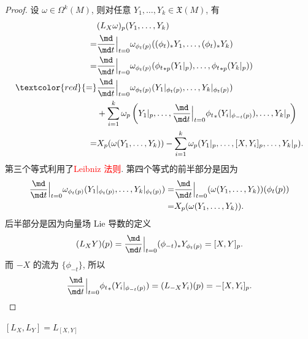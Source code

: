     \begin{proof}
        设 $\omega\in\Omega^k(M)$, 则对任意 $Y_1,\dots,Y_k\in\mathfrak{X}(M)$, 有
        \begin{align*}
            &(L_X\omega)_p(Y_1,\dots,Y_k) \\
            =& \frac{\md}{\md t}\Big|_{t=0}\omega_{\phi_t(p)}((\phi_t)_*Y_1,\dots,(\phi_t)_*Y_k) \\
            =& \frac{\md}{\md t}\Big|_{t=0}\omega_{\phi_t(p)}({\phi_t}_{*p}(Y_1|_p),\dots,{\phi_t}_{*p}(Y_k|_p)) \\
            \textcolor{red}{=}& \frac{\md}{\md t}\Big|_{t=0}\omega_{\phi_t(p)}(Y_1|_{\phi_t(p)},\dots,Y_k|_{\phi_t(p)}) \\
            \quad& + \sum_{i=1}^{k}\omega_p\left(Y_1|_p,\dots,\frac{\md}{\md t}\Big|_{t=0}{\phi_t}_{*}({Y_i}|_{\phi_{-t}(p)}),\dots,Y_k|_p\right) \\
            =& X_p(\omega(Y_1,\dots,Y_k)) - \sum_{i=1}^{k}\omega_p(Y_1|_p,\dots,[X,Y_i]_p,\dots,Y_k|_p).
        \end{align*}
        第三个等式利用了\textcolor{red}{Leibniz 法则}. 第四个等式的前半部分是因为
        \begin{align*}
            \frac{\md}{\md t}\Big|_{t=0}\omega_{\phi_t(p)}(Y_1|_{\phi_t(p)},\dots,Y_k|_{\phi_t(p)}) 
            =& \frac{\md}{\md t}\Big|_{t=0}(\omega(Y_1,\dots,Y_k))(\phi_t(p)) \\
            =& X_p(\omega(Y_1,\dots,Y_k)).
        \end{align*}
        后半部分是因为向量场 Lie 导数的定义
        \begin{equation*}
            (L_XY)(p) = \frac{\md}{\md t}\Big|_{t=0}(\phi_{-t})_*Y_{\phi_t(p)} = [X,Y]_p.
        \end{equation*}
        而 $-X$ 的流为 $\{\phi_{-t}\}$, 所以
        \begin{equation*}
            \frac{\md}{\md t}\Big|_{t=0}{\phi_t}_{*}({Y_i}|_{\phi_{-t}(p)}) = (L_{-X}Y_i)(p) = -[X,Y_i]_p.
        \end{equation*}
    \end{proof}
    \newpage
    \begin{proposition}
        $[L_X,L_Y]=L_{[X,Y]}$
    \end{proposition}
